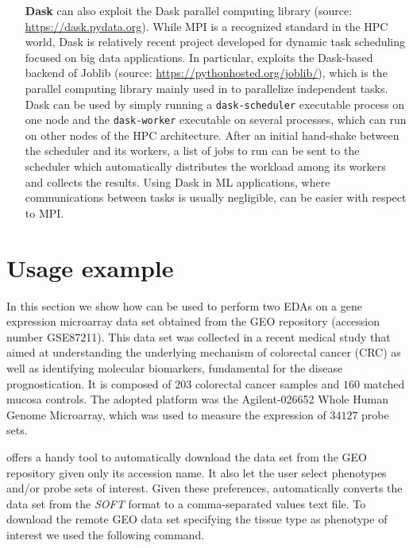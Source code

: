 \begin{enumerate}
\begin{enumerate}
		\item[\textbf{Dask}] \ade can also exploit the Dask parallel computing library (source: \url{https://dask.pydata.org}). While MPI is a recognized standard in the HPC world, Dask is relatively recent project developed for dynamic task scheduling focused on big data applications. In particular, \ade exploits the Dask-based backend of Joblib (source: \url{https://pythonhosted.org/joblib/}), which is the parallel computing library mainly used in \sklearn to parallelize independent tasks.
		Dask can be used by simply running a {\tt dask-scheduler} executable process on one node and the {\tt dask-worker} executable on several processes, which can run on other nodes of the HPC architecture.
		After an initial hand-shake between the scheduler and its workers, a list of jobs to run can be sent to the scheduler which automatically distributes the workload among its workers and collects the results.
		Using Dask in ML applications, where communications between tasks is usually negligible, can be easier with respect to MPI.
		
	\end{enumerate}
\end{enumerate}


\section{Usage example} \label{sec:usage_example}
In this section we show how \ade can be used to perform two EDAs on a gene expression microarray data set obtained from the GEO repository (accession number GSE87211).
This data set was collected in a recent medical study that aimed at understanding the underlying mechanism of colorectal cancer (CRC) as well as identifying molecular biomarkers, fundamental for the disease prognostication.
It is composed of $203$ colorectal cancer samples and $160$ matched mucosa controls. The adopted platform was the Agilent-026652 Whole Human Genome Microarray, which was used to measure the expression of $34127$ probe sets.

\ade offers a handy tool to automatically download the data set from the GEO repository given only its accession name.
It also let the user select phenotypes and/or probe sets of interest. Given these preferences, \ade automatically converts the data set from the \textit{SOFT} format to a comma-separated values text file. To download the remote GEO data set specifying the tissue type as phenotype of interest we used the following command.

